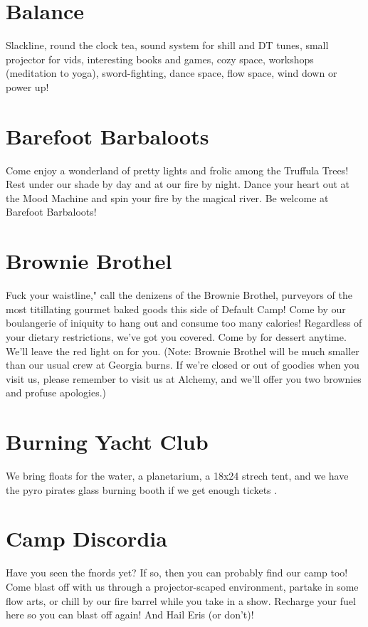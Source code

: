 \section*{Balance}
Slackline, round the clock tea, sound system for shill and DT tunes, small projector for vids, interesting books and games, cozy space, workshops (meditation to yoga), sword-fighting, dance space, flow space, wind down or power up!  


\section*{Barefoot Barbaloots}
Come enjoy a wonderland of pretty lights and frolic among the Truffula Trees!  Rest under our shade by day and at our fire by night. Dance your heart out at the Mood Machine and spin your fire by the magical river. Be welcome at Barefoot Barbaloots! 


\section*{Brownie Brothel}
Fuck your waistline," call the denizens of the Brownie Brothel, purveyors of the most titillating gourmet baked goods this side of Default Camp! Come by our boulangerie of iniquity to hang out and consume too many calories! Regardless of your dietary restrictions, we've got you covered. Come by for dessert anytime. We'll leave the red light on for you. (Note: Brownie Brothel will be much smaller than our usual crew at Georgia burns. If we’re closed or out of goodies when you visit us, please remember to visit us at Alchemy, and we’ll offer you two brownies and profuse apologies.) 


\section*{Burning Yacht Club}
We bring floats for the water, a planetarium, a 18x24 strech tent, and we have the pyro pirates glass burning booth if we get enough tickets . 


\section*{Camp Discordia}
Have you seen the fnords yet? If so, then you can probably find our camp too! Come blast off with us through a projector-scaped environment, partake in some flow arts, or chill by our fire barrel while you take in a show. Recharge your fuel here so you can blast off again! And Hail Eris (or don't)! 


